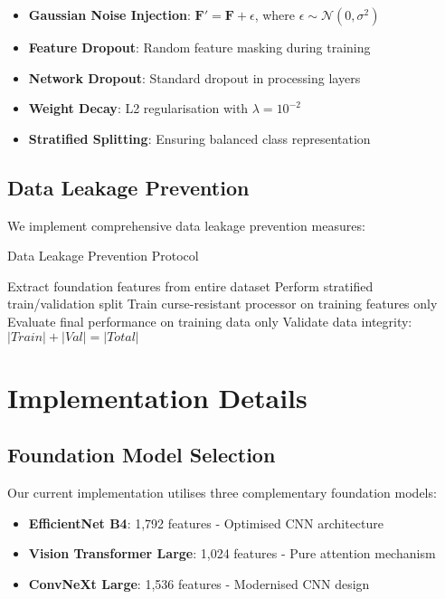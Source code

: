 \documentclass[11pt,a4paper]{article}
\begin{document}
\begin{itemize}
    \item \textbf{Gaussian Noise Injection}: $\mathbf{F}' = \mathbf{F} + \epsilon$, where $\epsilon \sim \mathcal{N}(0, \sigma^2)$
    \item \textbf{Feature Dropout}: Random feature masking during training
    \item \textbf{Network Dropout}: Standard dropout in processing layers
    \item \textbf{Weight Decay}: L2 regularisation with $\lambda = 10^{-2}$
    \item \textbf{Stratified Splitting}: Ensuring balanced class representation
\end{itemize}

\subsection{Data Leakage Prevention}

We implement comprehensive data leakage prevention measures:

\begin{algorithm}
\caption{Data Leakage Prevention Protocol}
\begin{algorithmic}[1]
\STATE Extract foundation features from entire dataset
\STATE Perform stratified train/validation split
\STATE Train curse-resistant processor on training features only
\STATE Evaluate final performance on training data only
\STATE Validate data integrity: $|Train| + |Val| = |Total|$
\end{algorithmic}
\end{algorithm}

\section{Implementation Details}

\subsection{Foundation Model Selection}

Our current implementation utilises three complementary foundation models:

\begin{itemize}
    \item \textbf{EfficientNet B4}: 1,792 features - Optimised CNN architecture
    \item \textbf{Vision Transformer Large}: 1,024 features - Pure attention mechanism
    \item \textbf{ConvNeXt Large}: 1,536 features - Modernised CNN design
\end{itemize}
\end{document}
